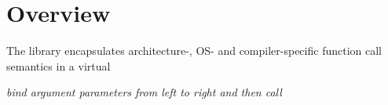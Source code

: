 %
%
%
%

\newpage

\section{Overview}

The  library encapsulates architecture-, OS- and compiler-specific
function call semantics in a virtual

\begin{center}
\emph{bind argument parameters from left to right and then call}
\end{center}
 
